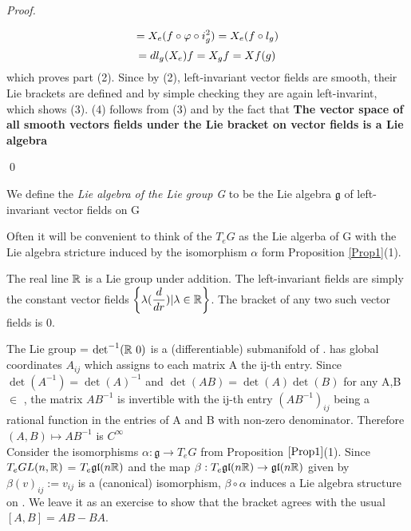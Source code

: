 \begin{proposition}
\begin{proof}
\begin{center}
\begin{equation*}
\hfill = X_{e}(f\circ \varphi \circ i^2_{g}) = X_{e}(f\circ l_{g})\end{equation*}\begin{equation*}
\hfill = dl_{g}(X_{e})f = X_{g} f = Xf(g)
 \end{equation*}
which proves part (2).
   Since by (2), left-invariant vector fields are smooth, their Lie brackets are defined and by simple checking they 
   are again left-invarint, which shows (3). (4) follows from (3) and by the fact that \textbf{The vector space of all smooth 
   vectors fields under the Lie bracket on vector fields is a Lie algebra}
\end{center}

\qed
\end{proof}

\end{proposition}
\begin{definition}
 We define the \textit{Lie algebra of the Lie group G} to be the Lie algebra $\mathfrak{g}$ of left-invariant vector fields
 on G
\end{definition}
Often it will be convenient to think of the $T_{e} G$ as the Lie algerba of G with the Lie algebra stricture induced by the 
isomorphism $\alpha$ form Proposition \ref{Prop1}(1).
\begin{example}
 The real line  $\mathbb{R}$ is a Lie group under addition. The left-invariant fields are simply the constant vector
 fields $\left\lbrace\lambda(\dfrac{d}{dr})|\lambda \in \mathbb{R}\right\rbrace$. The bracket of any two such vector fields is 0.
\end{example}
\begin{example}
 The Lie group \Gl = $\det^{-1}(\Rbb \ {0})$ is a (differentiable) submanifold of 
 \gl. \Gl has global coordinates $A_{ij}$ which assigns to each matrix A the ij-th entry. Since
 $\det(A^{-1})= \det(A)^{-1}$ and $\det(AB) = \det(A)\det(B)$ for any A,B $\in$ \Gl, the matrix 
 $AB^{-1}$ is invertible with the ij-th entry $(AB^{-1})_{ij}$ being a rational function in the entries
 of A and B with non-zero denominator. Therefore $(A,B) \mapsto AB^{-1}$ is $C^{\infty}$
 \\\;\;\;Consider the isomorphisms $\alpha: \mathfrak{g} \rightarrow T_{e}G$ from Proposition $\ref{Prop1}$(1). Since $T_eGL(n,\mathbb{R})$
 = $T_e\mathfrak{gl}(n\mathbb{R})$ and the map $\beta: T_e\mathfrak{gl}(n\mathbb{R}) \rightarrow \mathfrak{gl}(n\mathbb{R})$ given by $\beta(v)_{ij}:= v_{ij}$ is a (canonical) isomorphism, 
 $\beta\circ \alpha$ induces a Lie algebra structure on \gl. We leave it as an exercise to show that the bracket agrees with the
 usual $[A,B] = AB - BA$. 
\end{example}
